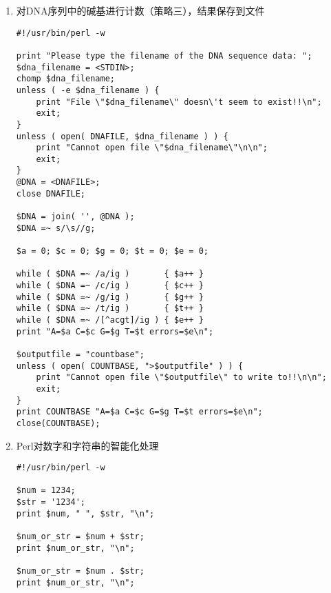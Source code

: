\documentclass{TIJMUjiaoanSY}
\begin{document}
\begin{enumerate}
\begin{enumerate}
\begin{verbatim}
$DNA = join( '', @DNA );
$DNA =~ s/\s//g;
$count_of_A = 0;
$count_of_C = 0;
$count_of_G = 0;
$count_of_T = 0;
$errors     = 0;

for ( $position = 0 ; $position < length $DNA ; ++$position ) {
    $base = substr( $DNA, $position, 1 );
    if ( $base eq 'A' ) {
        ++$count_of_A;
    }
    elsif ( $base eq 'C' ) {
        ++$count_of_C;
    }
    elsif ( $base eq 'G' ) {
        ++$count_of_G;
    }
    elsif ( $base eq 'T' ) {
        ++$count_of_T;
    }
    else {
        print "Error - I don\'t recognize this base: $base\n";
        ++$errors;
    }
}
print "A = $count_of_A\n";
print "C = $count_of_C\n";
print "G = $count_of_G\n";
print "T = $count_of_T\n";
print "errors = $errors\n";
\end{verbatim}

\otherTail
\newpage
\otherHeader

      \item 对DNA序列中的碱基进行计数（策略三），结果保存到文件
\begin{verbatim}
#!/usr/bin/perl -w

print "Please type the filename of the DNA sequence data: ";
$dna_filename = <STDIN>;
chomp $dna_filename;
unless ( -e $dna_filename ) {
    print "File \"$dna_filename\" doesn\'t seem to exist!!\n";
    exit;
}
unless ( open( DNAFILE, $dna_filename ) ) {
    print "Cannot open file \"$dna_filename\"\n\n";
    exit;
}
@DNA = <DNAFILE>;
close DNAFILE;

$DNA = join( '', @DNA );
$DNA =~ s/\s//g;

$a = 0; $c = 0; $g = 0; $t = 0; $e = 0;

while ( $DNA =~ /a/ig )       { $a++ }
while ( $DNA =~ /c/ig )       { $c++ }
while ( $DNA =~ /g/ig )       { $g++ }
while ( $DNA =~ /t/ig )       { $t++ }
while ( $DNA =~ /[^acgt]/ig ) { $e++ }
print "A=$a C=$c G=$g T=$t errors=$e\n";

$outputfile = "countbase";
unless ( open( COUNTBASE, ">$outputfile" ) ) {
    print "Cannot open file \"$outputfile\" to write to!!\n\n";
    exit;
}
print COUNTBASE "A=$a C=$c G=$g T=$t errors=$e\n";
close(COUNTBASE);
\end{verbatim}
      \item Perl对数字和字符串的智能化处理
\begin{verbatim}
#!/usr/bin/perl -w

$num = 1234;
$str = '1234';
print $num, " ", $str, "\n";

$num_or_str = $num + $str;
print $num_or_str, "\n";

$num_or_str = $num . $str;
print $num_or_str, "\n";
\end{verbatim}
    \end{enumerate}
\end{enumerate}

\otherTail
\end{document}
